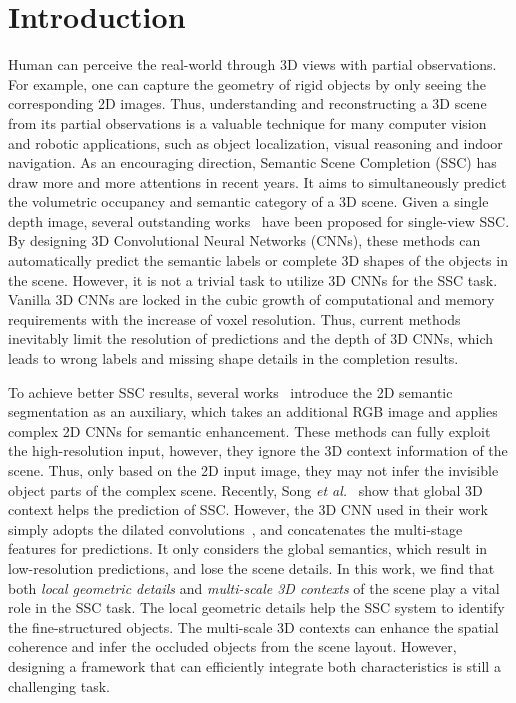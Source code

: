 \documentclass[10pt,twocolumn,letterpaper]{article}
\begin{document}
\section{Introduction}
Human can perceive the real-world through 3D views with partial observations.
For example, one can capture the geometry of rigid objects by only seeing the corresponding 2D images.
Thus, understanding and reconstructing a 3D scene from its partial observations is a valuable technique for many computer vision and robotic applications, such as object localization, visual reasoning and indoor navigation.
As an encouraging direction, Semantic Scene Completion (SSC) has draw more and more attentions in recent years.
It aims to simultaneously predict the volumetric occupancy and semantic category of a 3D scene.
Given a single depth image, several outstanding works~\cite{song2017semantic,guo2018view,zhang2018semantic} have been proposed for single-view SSC.
By designing 3D Convolutional Neural Networks (CNNs), these methods can automatically predict the semantic labels or complete 3D shapes of the objects in the scene.
However, it is not a trivial task to utilize 3D CNNs for the SSC task.
Vanilla 3D CNNs are locked in the cubic growth of computational and memory requirements with the increase of voxel resolution.
Thus, current methods inevitably limit the resolution of predictions and the depth of 3D CNNs, which leads to wrong labels and missing shape details in the completion results.


To achieve better SSC results, several works~\cite{guedes2018semantic,garbade2018two,liu2018see,li2019rgbd} introduce the 2D semantic segmentation as an auxiliary, which takes an additional RGB image and applies complex 2D CNNs for semantic enhancement.
These methods can fully exploit the high-resolution input, however, they ignore the 3D context information of the scene.
Thus, only based on the 2D input image, they may not infer the invisible object parts of the complex scene.
Recently, Song \emph{et al.}~\cite{song2017semantic} show that global 3D context helps the prediction of SSC.
However, the 3D CNN used in their work simply adopts the dilated convolutions~\cite{yu2016multi}, and concatenates the multi-stage features for predictions.
It only considers the global semantics, which result in low-resolution predictions, and lose the scene details.
In this work, we find that both \emph{local geometric details} and \emph{multi-scale 3D contexts} of the scene play a vital role in the SSC task.
The local geometric details help the SSC system to identify the fine-structured objects.
The multi-scale 3D contexts can enhance the spatial coherence and infer the occluded objects from the scene layout.
However, designing a framework that can efficiently integrate both characteristics is still a challenging task.
\end{document}
